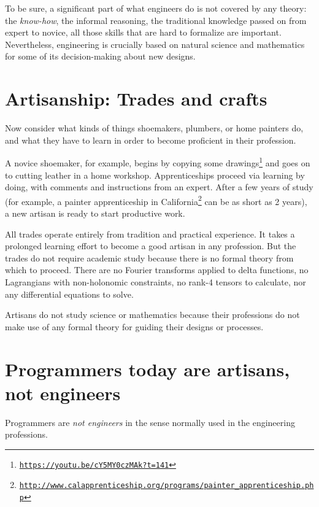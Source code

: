 To be sure, a significant part of what engineers do is not covered
by any theory: the \emph{know-how}, the informal reasoning, the traditional
knowledge passed on from expert to novice,  \textemdash{} all those
skills that are hard to formalize are important. Nevertheless, engineering
is crucially based on natural science and mathematics for some of
its decision-making about new designs.

\section{Artisanship: Trades and crafts }

Now consider what kinds of things shoemakers, plumbers, or home painters
do, and what they have to learn in order to become proficient in their
profession.

A novice shoemaker, for example, begins by copying some drawings\footnote{\texttt{\href{https://youtu.be/cY5MY0czMAk?t=141}{https://youtu.be/cY5MY0czMAk?t=141}}}
and goes on to cutting leather in a home workshop. Apprenticeships
proceed via learning by doing, with comments and instructions from
an expert. After a few years of study (for example, a painter apprenticeship
in California\footnote{\texttt{\href{http://www.calapprenticeship.org/programs/painter_apprenticeship.php}{http://www.calapprenticeship.org/programs/painter\_apprenticeship.php}}}
can be as short as 2 years), a new artisan is ready to start productive
work. 

All trades operate entirely from tradition and practical experience.
It takes a prolonged learning effort to become a good artisan in any
profession. But the trades do not require academic study because there
is no formal theory from which to proceed. There are no Fourier transforms
applied to delta functions, no Lagrangians with non-holonomic constraints,
no rank-4 tensors to calculate, nor any differential equations to
solve.

Artisans do not study science or mathematics because their professions
do not make use of any formal theory for guiding their designs or
processes.

\section{Programmers today are artisans, not engineers }

Programmers are \emph{not engineers} in the sense normally used in
the engineering professions.


